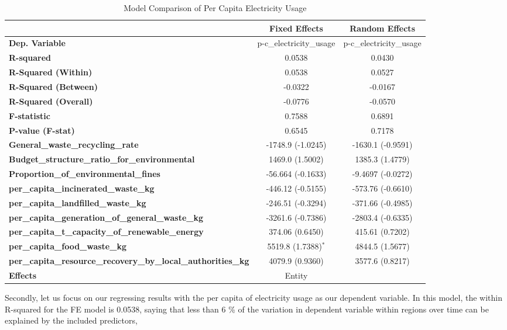 \documentclass{article}
\begin{document}
\begin{table}[H]
\centering
\caption{Model Comparison of Per Capita Electricity Usage}
\begin{tabular}{lcc}
\toprule
 & \textbf{Fixed Effects} & \textbf{Random Effects} \\
\midrule
\textbf{Dep. Variable} & p-c\_electricity\_usage & p-c\_electricity\_usage \\
\textbf{R-squared} & 0.0538 & 0.0430 \\
\textbf{R-Squared (Within)} & 0.0538 & 0.0527 \\
\textbf{R-Squared (Between)} & -0.0322 & -0.0167 \\
\textbf{R-Squared (Overall)} & -0.0776 & -0.0570 \\
\textbf{F-statistic} & 0.7588 & 0.6891 \\
\textbf{P-value (F-stat)} & 0.6545 & 0.7178 \\
\midrule
\textbf{General\_waste\_recycling\_rate} & -1748.9 (-1.0245) & -1630.1 (-0.9591) \\
\textbf{Budget\_structure\_ratio\_for\_environmental} & 1469.0 (1.5002) & 1385.3 (1.4779) \\
\textbf{Proportion\_of\_environmental\_fines} & -56.664 (-0.1633) & -9.4697 (-0.0272) \\
\textbf{per\_capita\_incinerated\_waste\_kg} & -446.12 (-0.5155) & -573.76 (-0.6610) \\
\textbf{per\_capita\_landfilled\_waste\_kg} & -246.51 (-0.3294) & -371.66 (-0.4985) \\
\textbf{per\_capita\_generation\_of\_general\_waste\_kg} & -3261.6 (-0.7386) & -2803.4 (-0.6335) \\
\textbf{per\_capita\_t\_capacity\_of\_renewable\_energy} & 374.06 (0.6450) & 415.61 (0.7202) \\
\textbf{per\_capita\_food\_waste\_kg} & 5519.8 (1.7388)$^{*}$ & 4844.5 (1.5677) \\
\textbf{per\_capita\_resource\_recovery\_by\_local\_authorities\_kg} & 4079.9 (0.9360) & 3577.6 (0.8217) \\
\midrule
\textbf{Effects} & Entity & \\
\bottomrule
\end{tabular}
\end{table}
Secondly, let us focus on our regressing results with the per capita of electricity usage as our dependent variable. 
In this model, the within R-squared for the FE model is 0.0538, saying that less than 6 \% of the variation in dependent variable within regions over time can be explained by the included predictors, 
\end{document}
